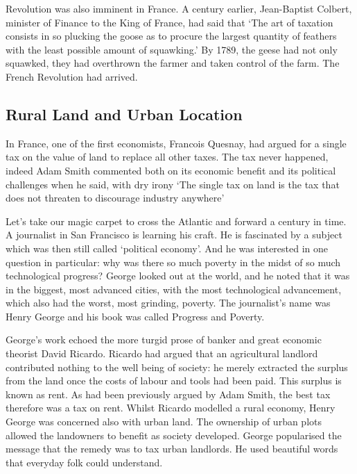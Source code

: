 \documentclass[]{tufte-handout}
\begin{document}
Revolution was also imminent in France. A century earlier, Jean-Baptist
Colbert, minister of Finance to the King of France, had said that `The
art of taxation consists in so plucking the goose as to procure the
largest quantity of feathers with the least possible amount of
squawking.' By 1789, the geese had not only squawked, they had
overthrown the farmer and taken control of the farm. The French
Revolution had arrived.

\hypertarget{rural-land-and-urban-location}{%
\subsection{Rural Land and Urban
Location}\label{rural-land-and-urban-location}}

In France, one of the first economists, Francois Quesnay, had argued for
a single tax on the value of land to replace all other taxes. The tax
never happened, indeed Adam Smith commented both on its economic benefit
and its political challenges when he said, with dry irony `The single
tax on land is the tax that does not threaten to discourage industry
anywhere'

Let's take our magic carpet to cross the Atlantic and forward a century
in time. A journalist in San Francisco is learning his craft. He is
fascinated by a subject which was then still called `political economy'.
And he was interested in one question in particular: why was there so
much poverty in the midst of so much technological progress? George
looked out at the world, and he noted that it was in the biggest, most
advanced cities, with the most technological advancement, which also had
the worst, most grinding, poverty. The journalist's name was Henry
George and his book was called Progress and Poverty.

George's work echoed the more turgid prose of banker and great economic
theorist David Ricardo. Ricardo had argued that an agricultural landlord
contributed nothing to the well being of society: he merely extracted
the surplus from the land once the costs of labour and tools had been
paid. This surplus is known as rent. As had been previously argued by
Adam Smith, the best tax therefore was a tax on rent. Whilst Ricardo
modelled a rural economy, Henry George was concerned also with urban
land. The ownership of urban plots allowed the landowners to benefit as
society developed. George popularised the message that the remedy was to
tax urban landlords. He used beautiful words that everyday folk could
understand.
\end{document}
